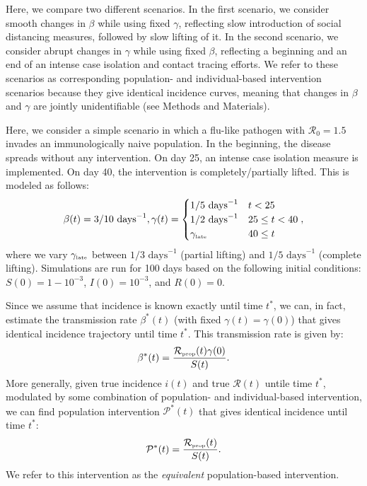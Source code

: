 \documentclass[12pt]{article}
\newcommand{\Rx}[1]{\ensuremath{{\mathcal R}_{#1}}\xspace}
\newcommand{\Ro}{\Rx{0}}
\newcommand{\RR}{\ensuremath{{\mathcal R}}\xspace}
\newcommand{\tsub}[2]{#1_{{\textrm{\tiny #2}}}}
\newcommand{\PP}{{\mathcal P}}
\begin{document}
Here, we compare two different scenarios.
In the first scenario, we consider smooth changes in $\beta$ while using fixed $\gamma$, reflecting slow introduction of social distancing measures, followed by slow lifting of it.
In the second scenario, we consider abrupt changes in $\gamma$ while using fixed $\beta$, reflecting a beginning and an end of an intense case isolation and contact tracing efforts.
We refer to these scenarios as corresponding population- and individual-based intervention scenarios because they give identical incidence curves, meaning that changes in $\beta$ and $\gamma$ are jointly unidentifiable (see Methods and Materials).



Here, we consider a simple scenario in which a flu-like pathogen with $\Ro = 1.5$ invades an immunologically naive population.
In the beginning, the disease spreads without any intervention.
On day 25, an intense case isolation measure is implemented. 
On day 40, the intervention is completely/partially lifted.
This is modeled as follows:
\begin{equation}
\beta(t) = 3/10\,\,\textrm{days}^{-1}, \gamma(t) = \begin{cases}
1/5\,\, \textrm{days}^{-1} & t < 25\\
1/2\,\, \textrm{days}^{-1} & 25 \leq t < 40 \\
\tsub{\gamma}{late} & 40 \leq t
\end{cases},
\end{equation}
where we vary $\tsub{\gamma}{late}$ between $1/3\,\, \textrm{days}^{-1}$ (partial lifting) and $1/5\,\, \textrm{days}^{-1}$ (complete lifting).
Simulations are run for 100 days based on the following initial conditions: $S(0) = 1 - 10^{-3}$, $I(0) = 10^{-3}$, and $R(0) = 0$.

Since we assume that incidence is known exactly until time $t^\ast$, we can, in fact, estimate the transmission rate $\beta^\ast(t)$ (with fixed $\gamma(t)=\gamma(0)$) that gives identical incidence trajectory until time $t^\ast$.
This transmission rate is given by:
\begin{equation}
\beta^\ast(t) = \frac{\tsub{\RR}{prop}(t)\gamma(0)}{S(t)}.
\end{equation}
More generally, given true incidence $i(t)$ and true $\RR(t)$ untile time $t^\ast$, modulated by some combination of population- and individual-based intervention, we can find population intervention $\PP^\ast(t)$ that gives identical incidence until time $t^\ast$:
\begin{equation}
\PP^\ast(t) = \frac{\tsub{\RR}{prop}(t)}{S(t)}.
\end{equation}
We refer to this intervention as the \emph{equivalent} population-based intervention.
\end{document}
